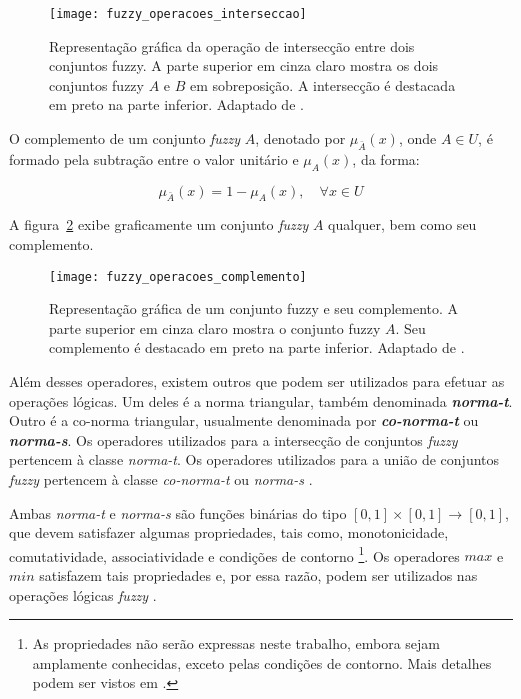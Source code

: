 \begin{figure}[!h]
  \centering
  \texttt{[image: fuzzy\_operacoes\_interseccao]}
  \caption[Operação de intersecção entre dois conjuntos fuzzy]{Representação gráfica da operação de intersecção entre dois conjuntos fuzzy. A parte superior em cinza claro mostra os dois conjuntos fuzzy $A$ e $B$ em sobreposição. A intersecção é destacada em preto na parte inferior. Adaptado de \citet{vrusias:06}.}
  \label{fig:fuzzy_operacoes_interseccao}
\end{figure}

\begin{defn}
\label{def:conjunto_fuzzy_complemento}
O complemento de um conjunto \emph{fuzzy} $A$, denotado por $\mu_{\bar{A}}(x)$, onde $A \in U$, é formado pela subtração entre o valor unitário e $\mu_A(x)$, da forma:

\begin{equation}
  \mu_{\bar{A}}(x) = 1 - \mu_A(x), \quad \forall x \in U
\end{equation}
\end{defn}

A figura~\ref{fig:fuzzy_operacoes_complemento} exibe graficamente um conjunto \emph{fuzzy} $A$ qualquer, bem como seu complemento.

\begin{figure}[!h]
  \centering
  \texttt{[image: fuzzy\_operacoes\_complemento]}
  \caption[Conjunto fuzzy e seu complemento]{Representação gráfica de um conjunto fuzzy e seu complemento. A parte superior em cinza claro mostra o conjunto fuzzy $A$. Seu complemento é destacado em preto na parte inferior. Adaptado de \citet{vrusias:06}.}
  \label{fig:fuzzy_operacoes_complemento}
\end{figure}

Além desses operadores, existem outros que podem ser utilizados para efetuar as operações lógicas. Um deles é a norma triangular, também denominada \textbf{\emph{norma-t}}. Outro é a co-norma triangular, usualmente denominada por \textbf{\emph{co-norma-t}} ou \textbf{\emph{norma-s}}. Os operadores utilizados para a intersecção de conjuntos \emph{fuzzy} pertencem à classe \emph{norma-t}. Os operadores utilizados para a união de conjuntos \emph{fuzzy} pertencem à classe \emph{co-norma-t} ou \emph{norma-s} \citep{zimmermann:01}.

Ambas \emph{norma-t} e \emph{norma-s} são funções binárias do tipo $[0, 1] \times [0, 1] \rightarrow [0, 1]$, que devem satisfazer algumas propriedades, tais como, monotonicidade, comutatividade, associatividade e condições de contorno \footnote{As propriedades não serão expressas neste trabalho, embora sejam amplamente conhecidas, exceto pelas condições de contorno. Mais detalhes podem ser vistos em \citet{zimmermann:01}.}. Os operadores $max$ e $min$ satisfazem tais propriedades e, por essa razão, podem ser utilizados nas operações lógicas \emph{fuzzy} \citep{zimmermann:01}.


